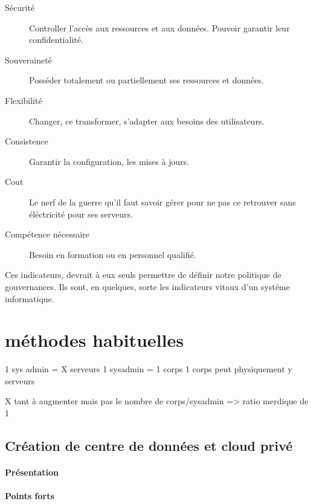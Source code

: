 \documentclass[11pt, a4paper ]{article}
\let\stdsection\section
\renewcommand\section{\newpage\stdsection}
\begin{document}
\begin{description}

	\item[Sécurité]
		Controller l'accès aux ressources et aux données. Pouvoir garantir leur confidentialité.

	\item[Souveraineté]
		Posséder totalement ou partiellement ses ressources et données.

	\item[Flexibilité]
		Changer, ce transformer, s'adapter aux besoins des utilisateurs.

	\item[Consistence]
		Garantir la configuration, les mises à jours.

	\item[Cout]
		Le nerf de la guerre qu'il faut savoir gérer pour ne pas ce retrouver sans éléctricité pour ses serveurs.

	\item[Compétence nécessaire]
		Besoin en formation ou en personnel qualifié.

\end{description}

Ces indicateurs, devrait à eux seuls permettre de définir notre politique de gouvernances. Ils sont, en quelques, sorte les indicateurs vitaux d'un systéme informatique.

		\section{méthodes habituelles} %

1 sys admin = X serveurs
1 sysadmin = 1 corps
1 corps peut physiquement y serveurs

X tant à augmenter mais pas le nombre de corps/sysadmin => ratio merdique de 1


			\subsection{Création de centre de données et cloud privé}
\paragraph{Présentation}

\paragraph{Points forts}
\end{document}
